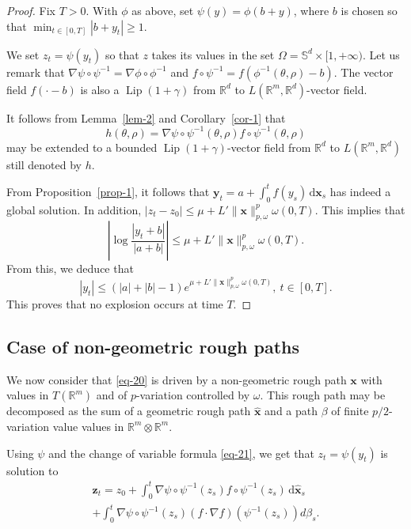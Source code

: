 \documentclass[a4paper,12pt]{article}
\theoremstyle{definition}
\newcommand{\vd}{\,\mathrm{d}}
\newcommand{\bx}{\mathbf{x}}
\newcommand{\by}{\mathbf{y}}
\newcommand{\bz}{\mathbf{z}}
\newcommand{\RR}{\mathbb{R}}
\newcommand{\SSS}{\mathbb{S}}
\DeclareMathOperator{\Lip}{Lip}
\begin{document}
\begin{proof}
Fix $T>0$.
With $\phi$ as above,
set $\psi(y)=\phi(b+y)$, where $b$ is chosen so that 
$\min_{t\in[0,T]}|b+y_t|\geq 1$.

We set $z_t=\psi(y_t)$ so that $z$ takes its values
in the set $\Omega=\SSS^d\times [1,+\infty)$.
Let us remark that $\nabla \psi\circ \psi^{-1}=\nabla\phi\circ \phi^{-1}$
and $f\circ \psi^{-1}=f(\phi^{-1}(\theta,\rho)-b)$.
The vector field $f(\cdot-b)$ is also a $\Lip(1+\gamma)$ from $\RR^d$ to $L(\RR^m,\RR^d)$-vector field.

It follows from Lemma~\ref{lem-2} and Corollary~\ref{cor-1} that 
\begin{equation*}
h(\theta,\rho)=\nabla\psi\circ \psi^{-1}(\theta,\rho)
f\circ\psi^{-1}(\theta,\rho)
\end{equation*}
may be extended to a bounded $\Lip(1+\gamma)$-vector field from $\RR^d$ to $L(\RR^m,\RR^d)$
still denoted by $h$.

From Proposition~\ref{prop-1}, it follows that 
$\by_t=a+\int_0^t f(y_s)\vd\bx_s$ has indeed a global 
solution.
In addition, 
$|z_t-z_0|\leq \mu+L'\|\bx\|_{p,\omega}^p\omega(0,T)$.
This implies that
\begin{equation*}
\left|\log\frac{|y_t+b|}{|a+b|}\right|\leq \mu+L'\|\bx\|^p_{p,\omega}\omega(0,T).
\end{equation*}
From this, we deduce that 
\begin{equation*}
|y_t|\leq (|a|+|b|-1)e^{\mu+L'\|\bx\|_{p,\omega}^p\omega(0,T)},\ t\in[0,T].
\end{equation*}
This proves that no explosion occurs at time $T$.
\end{proof}

\subsection{Case of non-geometric rough paths}

We now consider that \eqref{eq-20} is driven by a non-geometric
rough path $\bx$ with values in $T(\RR^m)$ and of $p$-variation controlled by $\omega$. 
This rough path may be decomposed as the sum of 
a geometric rough path $\widehat{\bx}$ and a path $\beta$ of finite
$p/2$-variation value values in $\RR^m\otimes\RR^m$.

Using $\psi$ and the change of variable formula \eqref{eq-21}, 
we get that $z_t=\psi(y_t)$ is solution to 
\begin{multline}
\label{eq-22}
\bz_t=z_0+\int_0^t \nabla\psi\circ\psi^{-1}(z_s)f\circ\psi^{-1}(z_s)\vd\widehat{\bx}_s\\
+\int_0^t \nabla \psi\circ \psi^{-1}(z_s)
(f\cdot\nabla f)(\psi^{-1}(z_s)) d\beta_s.
\end{multline}
\end{document}
